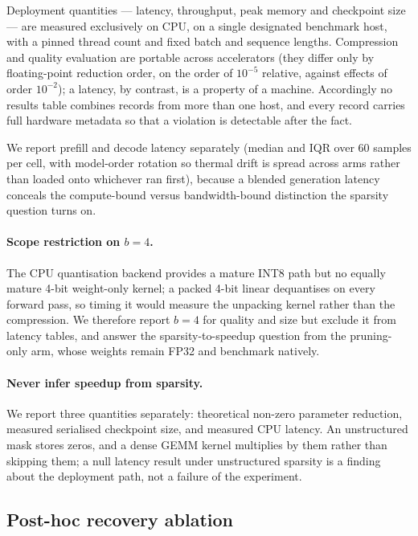 Deployment quantities --- latency, throughput, peak memory and checkpoint size --- are
measured exclusively on CPU, on a single designated benchmark host, with a pinned thread
count and fixed batch and sequence lengths. Compression and quality evaluation are portable
across accelerators (they differ only by floating-point reduction order, on the order of
$10^{-5}$ relative, against effects of order $10^{-2}$); a latency, by contrast, is a
property of a machine. Accordingly no results table combines records from more than one
host, and every record carries full hardware metadata so that a violation is detectable
after the fact.

We report prefill and decode latency separately (median and IQR over $60$ samples per cell,
with model-order rotation so thermal drift is spread across arms rather than loaded onto
whichever ran first), because a blended generation latency conceals the compute-bound versus
bandwidth-bound distinction the sparsity question turns on.

\paragraph{Scope restriction on $b{=}4$.} The CPU quantisation backend provides a mature
INT8 path but no equally mature 4-bit weight-only kernel; a packed 4-bit linear dequantises
on every forward pass, so timing it would measure the unpacking kernel rather than the
compression. We therefore report $b{=}4$ for quality and size but exclude it from latency
tables, and answer the sparsity-to-speedup question from the pruning-only arm, whose weights
remain FP32 and benchmark natively.

\paragraph{Never infer speedup from sparsity.} We report three quantities separately:
theoretical non-zero parameter reduction, measured serialised checkpoint size, and measured
CPU latency. An unstructured mask stores zeros, and a dense GEMM kernel multiplies by them
rather than skipping them; a null latency result under unstructured sparsity is a finding
about the deployment path, not a failure of the experiment.

\subsection{Post-hoc recovery ablation}
\label{subsec:recovery}

